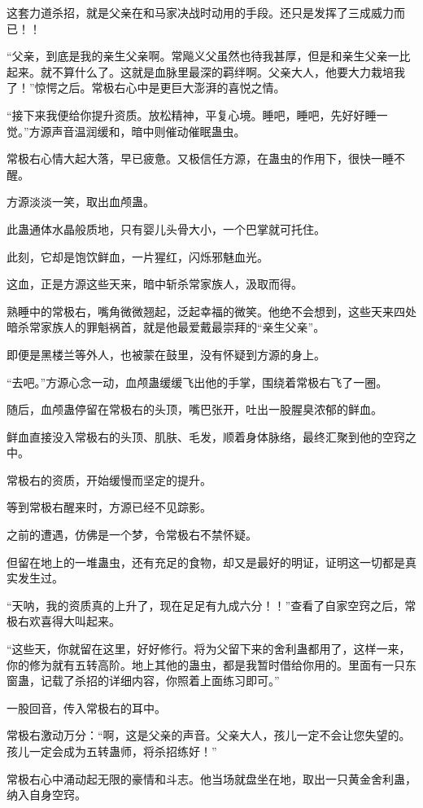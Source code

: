 \begin{this_body}
这套力道杀招，就是父亲在和马家决战时动用的手段。还只是发挥了三成威力而已！！

“父亲，到底是我的亲生父亲啊。常飚义父虽然也待我甚厚，但是和亲生父亲一比起来。就不算什么了。这就是血脉里最深的羁绊啊。父亲大人，他要大力栽培我了！”惊愕之后。常极右心中是更巨大澎湃的喜悦之情。

“接下来我便给你提升资质。放松精神，平复心境。睡吧，睡吧，先好好睡一觉。”方源声音温润缓和，暗中则催动催眠蛊虫。

常极右心情大起大落，早已疲惫。又极信任方源，在蛊虫的作用下，很快一睡不醒。

方源淡淡一笑，取出血颅蛊。

此蛊通体水晶般质地，只有婴儿头骨大小，一个巴掌就可托住。

此刻，它却是饱饮鲜血，一片猩红，闪烁邪魅血光。

这血，正是方源这些天来，暗中斩杀常家族人，汲取而得。

熟睡中的常极右，嘴角微微翘起，泛起幸福的微笑。他绝不会想到，这些天来四处暗杀常家族人的罪魁祸首，就是他最爱戴最崇拜的“亲生父亲”。

即便是黑楼兰等外人，也被蒙在鼓里，没有怀疑到方源的身上。

“去吧。”方源心念一动，血颅蛊缓缓飞出他的手掌，围绕着常极右飞了一圈。

随后，血颅蛊停留在常极右的头顶，嘴巴张开，吐出一股腥臭浓郁的鲜血。

鲜血直接没入常极右的头顶、肌肤、毛发，顺着身体脉络，最终汇聚到他的空窍之中。

常极右的资质，开始缓慢而坚定的提升。

等到常极右醒来时，方源已经不见踪影。

之前的遭遇，仿佛是一个梦，令常极右不禁怀疑。

但留在地上的一堆蛊虫，还有充足的食物，却又是最好的明证，证明这一切都是真实发生过。

“天呐，我的资质真的上升了，现在足足有九成六分！！”查看了自家空窍之后，常极右欢喜得大叫起来。

“这些天，你就留在这里，好好修行。将为父留下来的舍利蛊都用了，这样一来，你的修为就有五转高阶。地上其他的蛊虫，都是我暂时借给你用的。里面有一只东窗蛊，记载了杀招的详细内容，你照着上面练习即可。”

一股回音，传入常极右的耳中。

常极右激动万分：“啊，这是父亲的声音。父亲大人，孩儿一定不会让您失望的。孩儿一定会成为五转蛊师，将杀招练好！”

常极右心中涌动起无限的豪情和斗志。他当场就盘坐在地，取出一只黄金舍利蛊，纳入自身空窍。


\end{this_body}
